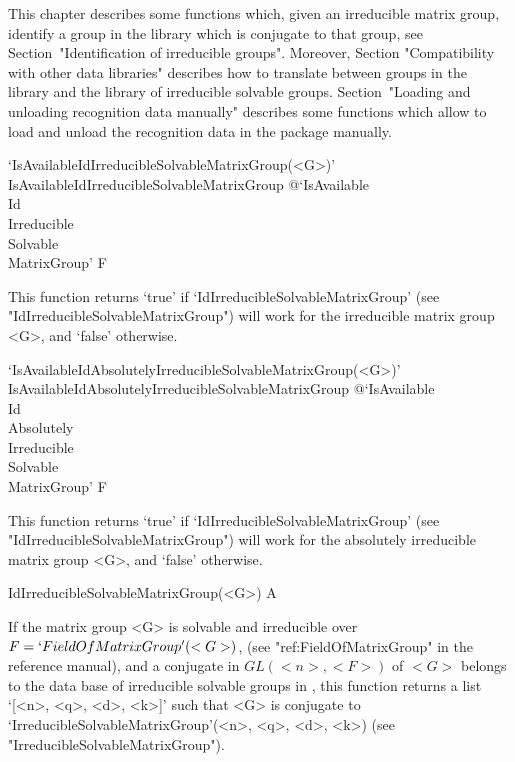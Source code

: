 


This chapter describes some functions which, given an irreducible matrix 
group, identify a group in the {\IRREDSOL} library which is conjugate
to that group, see Section~"Identification of irreducible groups".
Moreover,  Section "Compatibility with other data libraries" describes
how to  translate between groups in the {\IRREDSOL} library and the
{\GAP}  library of irreducible solvable groups. 
Section~"Loading and unloading recognition data manually" describes some 
functions which allow to load and unload the recognition data in the 
{\IRREDSOL} package manually.


\>`IsAvailableIdIrreducibleSolvableMatrixGroup(<G>)'%
{IsAvailableIdIrreducibleSolvableMatrixGroup}%
@{`IsAvailable\\Id\\Irreducible\\Solvable\\MatrixGroup'} F

This function returns `true' if `IdIrreducibleSolvableMatrixGroup' (see
"IdIrreducibleSolvableMatrixGroup") will work for the irreducible matrix group <G>, and `false' otherwise.

\>`IsAvailableIdAbsolutelyIrreducibleSolvableMatrixGroup(<G>)'%
{IsAvailableIdAbsolutelyIrreducibleSolvableMatrixGroup}%
@{`IsAvailable\\Id\\Absolutely\\Irreducible\\Solvable\\MatrixGroup'} F

This function returns `true' if `IdIrreducibleSolvableMatrixGroup' (see
"IdIrreducibleSolvableMatrixGroup") will work for the absolutely irreducible matrix group <G>, and `false' otherwise.


\>IdIrreducibleSolvableMatrixGroup(<G>) A

If the matrix group <G> is solvable and irreducible over $F
= `FieldOfMatrixGroup'(<G>)$, (see "ref:FieldOfMatrixGroup" in the {\GAP} reference manual), and a conjugate in
$GL(<n>, <F>)$ of $<G>$ belongs to the data base of  irreducible solvable groups in
{\IRREDSOL}, this function returns a list `[<n>, <q>, <d>, <k>]' such that <G> is
conjugate to  `IrreducibleSolvableMatrixGroup'(<n>, <q>, <d>, <k>) (see
"IrreducibleSolvableMatrixGroup").


